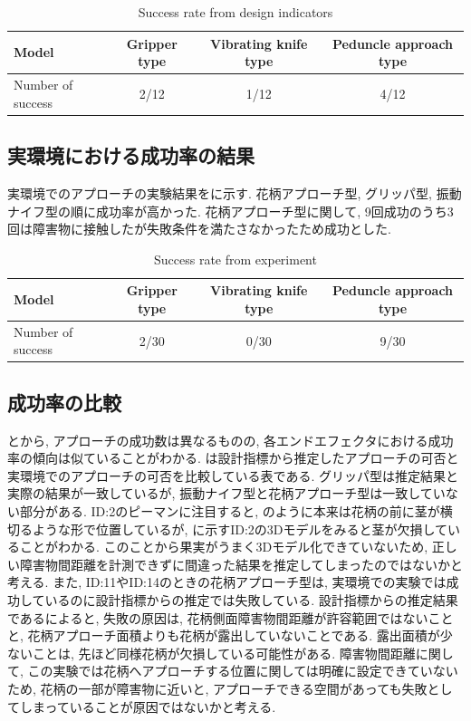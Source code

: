 \begin{table}[H]
  \begin{center}
    \begin{tabular}{l|ccc}
      Model & Gripper type & Vibrating knife type & Peduncle approach type\\ \hline\hline
      Number of success & 2/12 & 1/12 & 4/12\\
    \end{tabular}
    \caption{Success rate from design indicators}
    \label{Tab:successrateindicators}
  \end{center}
\end{table}

\subsection{実環境における成功率の結果}
実環境でのアプローチの実験結果をに示す.
花柄アプローチ型, グリッパ型, 振動ナイフ型の順に成功率が高かった.
花柄アプローチ型に関して, 9回成功のうち3回は障害物に接触したが失敗条件を満たさなかったため成功とした.

\begin{table}[H]
  \begin{center}
    \begin{tabular}{l|ccc}
      Model & Gripper type & Vibrating knife type & Peduncle approach type\\ \hline\hline
      Number of success & 2/30 & 0/30 & 9/30\\
    \end{tabular}
    \caption{Success rate from experiment}
    \label{Tab:successrateexperiment}
  \end{center}
\end{table}

\subsection{成功率の比較}
とから, アプローチの成功数は異なるものの, 各エンドエフェクタにおける成功率の傾向は似ていることがわかる.
は設計指標から推定したアプローチの可否と実環境でのアプローチの可否を比較している表である.
グリッパ型は推定結果と実際の結果が一致しているが, 振動ナイフ型と花柄アプローチ型は一致していない部分がある.
ID:2のピーマンに注目すると, のように本来は花柄の前に茎が横切るような形で位置しているが, に示すID:2の3Dモデルをみると茎が欠損していることがわかる.
このことから果実がうまく3Dモデル化できていないため, 正しい障害物間距離を計測できずに間違った結果を推定してしまったのではないかと考える.
また, ID:11やID:14のときの花柄アプローチ型は, 実環境での実験では成功しているのに設計指標からの推定では失敗している.
設計指標からの推定結果であるによると, 失敗の原因は, 花柄側面障害物間距離が許容範囲ではないことと, 花柄アプローチ面積よりも花柄が露出していないことである.
露出面積が少ないことは, 先ほど同様花柄が欠損している可能性がある.
障害物間距離に関して, この実験では花柄へアプローチする位置に関しては明確に設定できていないため, 花柄の一部が障害物に近いと, アプローチできる空間があっても失敗としてしまっていることが原因ではないかと考える.

